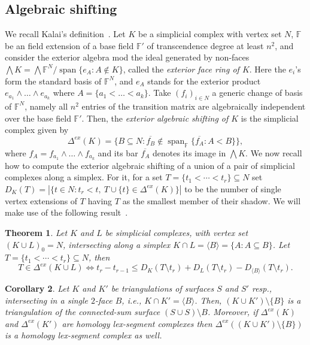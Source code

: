 \documentclass[11pt]{article}
\newtheorem{theorem}{Theorem}
\newtheorem{corollary}[theorem]{Corollary}
\numberwithin{claimcounter}{theorem}
\theoremstyle{remark}
\theoremstyle{definition}
\numberwithin{theorem}{section}
\newcommand{\F}{\mathbb{F}}
\DeclareMathOperator{\SPAN}{span}
\newcommand{\exshift}[1]{\Delta^{ex}(#1)}
\begin{document}
\subsection{Algebraic shifting}
We recall Kalai's definition~\cite{KalaiPart1}.
Let $K$ be a simplicial complex with vertex set $N$, $\F$ be an field extension of a base field $\F'$ of transcendence degree at least $n^2$, and consider the exterior algebra mod the ideal generated by non-faces $\bigwedge K = \bigwedge \F^{N}/\SPAN \{e_A \colon A \notin K\}$, called the  \emph{exterior face ring of $K$}. Here the $e_i$'s form the standard basis of $\F^{N}$, and $e_A$ stands for the exterior product $e_{a_1}\wedge\ldots\wedge e_{a_k}$ where $A=\{a_1<\ldots<a_k\}$.
Take $(f_i)_{i\in N}$ a generic change of basis of $\F^{N}$, namely all $n^2$ entries of the transition matrix are algebraically independent over the base field $\F'$. Then, the \emph{exterior algebraic shifting of $K$} is the simplicial complex given by $$\exshift K = \{B \subseteq N \colon \overline{f_B} \notin \SPAN_{\F} \{\overline{f_A}\colon A<B\}\},$$
where $f_A=f_{a_1}\wedge\ldots\wedge f_{a_k}$ and its bar $\overline{f_A}$ denotes its image in $\bigwedge K$.
%
We now recall how to compute the exterior algebraic shifting of a union of a pair of simplicial complexes along a simplex. For it, for a set $T=\{t_1<\cdots <t_r\}\subseteq N$ set $D_K(T) = |\{ t \in N \colon t_r<t,~T\cup \{t\} \in \exshift{K} \}|$ to be the number of single vertex extensions of $T$ having $T$ as the smallest member of their shadow. We will make use of the following result~\cite[Theorem 4.6]{nevo05-basic}.
\begin{theorem}
  \label{t:simplex-union}
  Let $K$ and $L$ be simplicial complexes, with vertex set $(K\cup L)_0 = N$, intersecting along a simplex $K\cap L = \langle B\rangle = \{A \colon A\subseteq B\}$. Let $T=\{t_1<\cdots <t_r\}\subseteq N$, then
  $$T\in \exshift{K\cup L} \iff t_r-t_{r-1}\leq D_K(T\setminus t_r)+D_L(T\setminus t_r)-D_{\langle B \rangle}(T\setminus t_r).$$
%
\end{theorem}
%
%
\begin{corollary}
  \label{c:gluehomlex}
  Let $K$ and $K'$ be triangulations of surfaces $S$ and $S'$ resp., intersecting in  
  a single $2$-face $B$, i.e., $K\cap K' = \langle B\rangle$.
  Then, $(K\cup K')\setminus \{B\}$ is a triangulation of the connected-sum surface $(S\cup S) \setminus B$.
  Moreover, if $\exshift K$ and $\exshift{K'}$ are homology lex-segment complexes then $\exshift{(K\cup K') \setminus \{ B \} }$ is a homology lex-segment complex as well.
\end{corollary}
\end{document}
